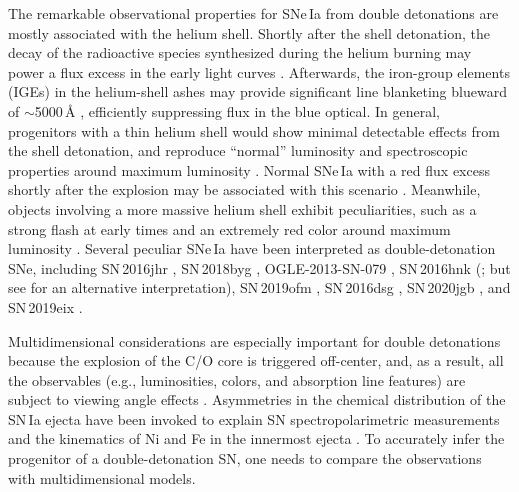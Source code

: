 \documentclass[twocolumn]{aastex631}
\begin{document}
\begin{CJK*}{UTF8}{gbsn}
The remarkable observational properties for SNe\,Ia from double detonations are mostly associated with the helium shell. Shortly after the shell detonation, the decay of the radioactive species synthesized during the helium burning may power a flux excess in the early light curves \citep{Woosley_1994,Fink_DD_2010,Kromer_DD_2010}. Afterwards, the iron-group elements (IGEs) in the helium-shell ashes may provide significant line blanketing blueward of $\sim$5000\,\r{A} \citep{Kromer_DD_2010}, efficiently suppressing flux in the blue optical. In general, progenitors with a thin helium shell would show minimal detectable effects from the shell detonation, and reproduce ``normal'' \citep[e.g., that of SN\,2011fe;][]{Nugent_11fe_2011} luminosity and spectroscopic properties around maximum luminosity \citep[e.g.,][]{polin_observational_2019, Townsley_2019,Magee_2021,Shen_2D_2021}. Normal SNe\,Ia with a red flux excess shortly after the explosion may be associated with this scenario \citep[e.g., SN\,2018aoz;][]{Ni_2022}. Meanwhile, objects involving a more massive helium shell exhibit peculiarities, such as a strong flash at early times and an extremely red color around maximum luminosity \citep{polin_observational_2019}. Several peculiar SNe\,Ia have been interpreted as double-detonation SNe, including SN\,2016jhr \citep{jiang_16jhr_2017}, SN\,2018byg \citep{de_18byg_2019}, OGLE-2013-SN-079 \citep[][interpreted as either a pure helium-shell detonation or a double detonation]{Inserra_OGLE13_079_2015}, SN\,2016hnk (\citealp{jacobson-galan_16hnk_2020,de_Ca_rich_2020}; but see \citealp{galbany_16hnk_2019} for an alternative interpretation), SN\,2019ofm \citep{de_Ca_rich_2020}, SN\,2016dsg \citep{Dong_16dsg_2022}, SN\,2020jgb \citep{Liu_20jgb_2023}, and SN\,2019eix \citep{Gonzalez_19eix_2023}.

Multidimensional considerations are especially important for double detonations because the explosion of the C/O core is triggered off-center, and, as a result, all the observables (e.g., luminosities, colors, and absorption line features) are subject to viewing angle effects \citep{Fink_DD_2010,Shen_2D_2021}. Asymmetries in the chemical distribution of the SN\,Ia ejecta have been invoked to explain SN spectropolarimetric measurements \citep[e.g.,][see \citealp{Wang_2008} for a review]{Wang_2003,Kasen_2003, Patat_2012} and the kinematics of Ni and Fe in the innermost ejecta \citep{Motohara_2006,Maeda_2010b,Maeda_2010,Maguire_2018,Li_2021}. To accurately infer the progenitor of a double-detonation SN, one needs to compare the observations with multidimensional models.


\end{CJK*}
\end{document}

